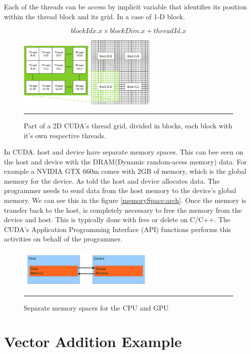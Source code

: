 Each of the threads can be access by implicit variable that identifies its position within the thread block and its grid. In a case of 1-D block. \cite{example}

$$blockIdx.x \times blockDim.x + threadId.x$$

\begin{figure}[htbp]
	\centering
		\includegraphics[width=0.6\textwidth]{Figures/grid.png}
		\rule{35em}{0.5pt}
	\caption[Part of the CUDA's 2D grid]{Part of a 2D CUDA's thread grid, divided in blocks, each block with it’s own respective threads.}
	\label{fig:grid}
\end{figure}

In CUDA. host and device have separate memory spaces. This can bee seen on the host and device with the DRAM(Dynamic random-acess memory) data. For example a NVIDIA GTX 660m comes with 2GB of memory, which is the global memory for the device. As told the host and device allocates data. The programmer needs to send data from the host memory to the device's global memory. We can see this in the figure  \ref{memorySpace:arch}.  Once the memory is transfer back to the host, is completely necessary to free the memory from the device and host. This is typically done with free or delete on C/C++. The CUDA's Application Programming Interface (API) functions performs this activities on behalf of the programmer.   \cite{hwu}

\begin{figure}[htbp]
	\centering
		\includegraphics[width=0.6\textwidth]{Figures/memorySpace.png}
		\rule{35em}{0.5pt}
	\caption[Memory Space GPU and CPU]{Separate memory spaces for the CPU and GPU}
	\label{fig:memorySpace}
\end{figure}

\section{Vector Addition Example}

